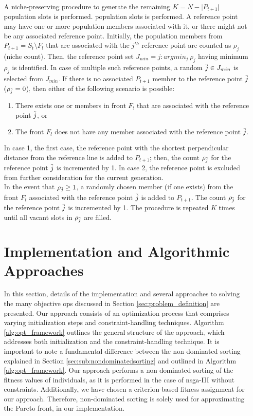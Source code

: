 A niche-preserving procedure to generate the remaining $K = N - \lvert P_{t+1} \rvert $ population slots is performed. population slots is performed. A reference point may have one or more population members associated with it, or there might not be any associated reference point. Initially, the population members from $P_{t+1} = S_t \setminus F_l$ that are associated with the $j^{th}$ reference point are counted as $\rho_j$ (niche count). Then, the reference point set $J_{min} = {j:argmin_j \ \rho_j}$ having minimum $\rho_j$ is identified. In case of multiple such reference points, a random $\Tilde{j} \in J_{min}$ is selected from $J_{min}$. 
If there is no associated $P_{t+1 }$ member to the reference point $\Tilde{j}$ ($\rho_{\Tilde{j}} = 0$), then either of the following scenario is possible: 
\begin{enumerate}
    \item There exists one or members in front $F_l$ that are associated with the reference point $\Tilde{j}$, or
    \item The front $F_l$ does not have any member associated with the reference point $\Tilde{j}$.
\end{enumerate}
In case 1, the first case, the reference point with the shortest perpendicular distance from the reference line is added to $P_{t+1}$; then, the count $\rho_{\Tilde{j}}$ for the reference point $\Tilde{j}$ is incremented by 1. In case 2, the reference point is excluded from further consideration for the current generation.\\
In the event that $\rho_{\Tilde{j}} \geq 1$, a randomly chosen member (if one exists) from the front  $F_l$ associated with the reference point $\Tilde{j}$ is added to $P_{t+1}$. The count $\rho_{\Tilde{j}}$ for the reference point $\Tilde{j}$ is incremented by 1. The procedure is repeated $K$ times until all vacant slots in $\rho_{\Tilde{j}}$ are filled.



\section{Implementation and Algorithmic Approaches}\label{sec:impl}
In this section, details of the implementation and several approaches to solving the many objective \glspl{op} discussed in Section \ref{sec:problem_definition} are presented. Our approach consists of an optimization process that comprises varying initialization steps and constraint-handling techniques. Algorithm \ref{alg:opt_framework} outlines the general structure of the approach, which addresses both initialization and the constraint-handling technique. It is important to note a fundamental difference between the non-dominated sorting explained in Section \ref{sec:sub:nondominatedsorting} and outlined in Algorithm \ref{alg:opt_framework}. Our approach performs a non-dominated sorting of the fitness values of individuals, as it is performed in the case of \gls{nsga}-III without constraints. Additionally, we have chosen a criterion-based fitness assignment for our approach. Therefore, non-dominated sorting is solely used for approximating the Pareto front, in our implementation.

